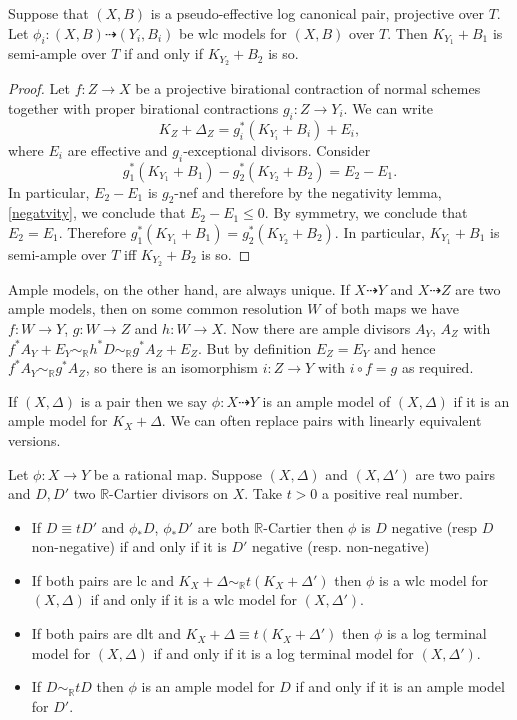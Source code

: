 \begin{lemma}\label{inv}
	Suppose that $(X,B)$ is a pseudo-effective log canonical pair, projective over $T$. 
	Let $\phi_{i} \colon (X, B) \dashrightarrow (Y_{i},B_{i})$ be wlc models for $(X,B)$ over $T$. 
	Then $K_{Y_{1}}+B_{1}$ is semi-ample over $T$ if and only if $K_{Y_{2}}+B_{2}$ is so.
\end{lemma}

\begin{proof}
	Let $f \colon Z \to X$ be a projective birational contraction of normal schemes together with proper birational contractions $g_i \colon Z \to Y_i$. 
	We can write $$K_Z+\Delta_Z = g_i^*(K_{Y_i}+B_i) + E_i,$$
	where $E_i$ are effective and $g_i$-exceptional divisors.
	Consider 
	$$g_1^*(K_{Y_1}+B_1)-g_2^*(K_{Y_2}+B_2)=E_2-E_1. $$
	In particular, $E_2-E_1$ is $g_2$-nef and therefore by the negativity lemma, \autoref{negatvity}, we conclude that $E_2 -E_1 \leq 0$. By symmetry, we conclude that $E_2=E_1$. Therefore $g_1^*(K_{Y_1}+B_1)=g_2^*(K_{Y_2}+B_2)$. In particular, $K_{Y_1}+B_1$ is semi-ample over $T$ iff $K_{Y_2}+B_2$ is so.
\end{proof}

Ample models, on the other hand, are always unique. If $X \dashrightarrow Y$ and $X \dashrightarrow Z$ are two ample models, then on some common resolution $W$ of both maps we have $f\colon W \to Y$, $g\colon W \to Z$ and $h\colon W \to X$. Now there are ample divisors $A_{Y}$, $A_{Z}$ with $f^{*}A_{Y}+E_{Y}\sim_{\mathbb{R}}h^{*}D \sim_{\mathbb{R}}g^{*}A_{Z}+E_{Z}$. But by definition $E_{Z}=E_{Y}$ and hence $f^{*}A_{Y}\sim_{\mathbb{R}}g^{*}A_{Z}$, so there is an isomorphism $i\colon Z \to Y$ with $i \circ f= g$ as required.


If $(X,\Delta)$ is a pair then we say $\phi\colon X \dashrightarrow Y$ is an ample model of $(X,\Delta)$ if it is an ample model for $K_{X}+\Delta$. We can often replace pairs with linearly equivalent versions.

\begin{lemma}\label{equiv}\cite[Lemma 3.6.8]{BCHM10}
	Let $\phi\colon X \to Y$ be a rational map. Suppose $(X,\Delta)$ and $(X,\Delta')$ are two pairs and $D,D'$ two $\mathbb{R}$-Cartier divisors on $X$. Take $t >0$ a positive real number.
	\begin{itemize}
		\item If $D \equiv tD'$ and $\phi_{*}D$, $\phi_{*}D'$ are both $\mathbb{R}$-Cartier then $\phi$ is $D$ negative (resp $D$ non-negative) if and only if it is $D'$ negative (resp. non-negative)
		\item If both pairs are lc and $K_{X}+\Delta \sim_{\mathbb{R}} t(K_{X}+\Delta')$ then $\phi$ is a wlc model for $(X,\Delta)$ if and only if it is a wlc model for $(X,\Delta')$.
		\item If both pairs are dlt and $K_{X}+\Delta \equiv t(K_{X}+\Delta')$ then $\phi$ is a log terminal model for $(X,\Delta)$ if and only if it is a log terminal model for $(X,\Delta')$.
		\item If $D\sim_{\mathbb{R}} tD$ then $\phi$ is an ample model for $D$ if and only if it is an ample model for $D'$.
	\end{itemize}
\end{lemma}

